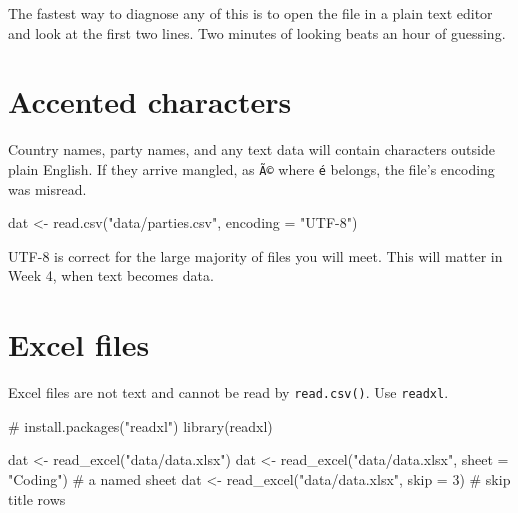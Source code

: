 \documentclass[
  a4paper,
]{scrbook}
\newenvironment{Shaded}{\begin{snugshade}}{\end{snugshade}}
\newcommand{\AttributeTok}[1]{\textcolor[rgb]{0.40,0.45,0.13}{#1}}
\newcommand{\CommentTok}[1]{\textcolor[rgb]{0.37,0.37,0.37}{#1}}
\newcommand{\DecValTok}[1]{\textcolor[rgb]{0.68,0.00,0.00}{#1}}
\newcommand{\FunctionTok}[1]{\textcolor[rgb]{0.28,0.35,0.67}{#1}}
\newcommand{\NormalTok}[1]{\textcolor[rgb]{0.00,0.23,0.31}{#1}}
\newcommand{\OtherTok}[1]{\textcolor[rgb]{0.00,0.23,0.31}{#1}}
\newcommand{\StringTok}[1]{\textcolor[rgb]{0.13,0.47,0.30}{#1}}
\begin{document}
The fastest way to diagnose any of this is to open the file in a plain
text editor and look at the first two lines. Two minutes of looking
beats an hour of guessing.

\section*{Accented characters}\label{accented-characters}


Country names, party names, and any text data will contain characters
outside plain English. If they arrive mangled, as \texttt{Ã©} where
\texttt{é} belongs, the file's encoding was misread.

\begin{Shaded}
\begin{Highlighting}[]
\NormalTok{dat }\OtherTok{\textless{}{-}} \FunctionTok{read.csv}\NormalTok{(}\StringTok{"data/parties.csv"}\NormalTok{, }\AttributeTok{encoding =} \StringTok{"UTF{-}8"}\NormalTok{)}
\end{Highlighting}
\end{Shaded}

UTF-8 is correct for the large majority of files you will meet. This
will matter in Week 4, when text becomes data.

\section*{Excel files}\label{excel-files}


Excel files are not text and cannot be read by \texttt{read.csv()}. Use
\texttt{readxl}.

\begin{Shaded}
\begin{Highlighting}[]
\CommentTok{\# install.packages("readxl")}
\FunctionTok{library}\NormalTok{(readxl)}

\NormalTok{dat }\OtherTok{\textless{}{-}} \FunctionTok{read\_excel}\NormalTok{(}\StringTok{"data/data.xlsx"}\NormalTok{)}
\NormalTok{dat }\OtherTok{\textless{}{-}} \FunctionTok{read\_excel}\NormalTok{(}\StringTok{"data/data.xlsx"}\NormalTok{, }\AttributeTok{sheet =} \StringTok{"Coding"}\NormalTok{)   }\CommentTok{\# a named sheet}
\NormalTok{dat }\OtherTok{\textless{}{-}} \FunctionTok{read\_excel}\NormalTok{(}\StringTok{"data/data.xlsx"}\NormalTok{, }\AttributeTok{skip =} \DecValTok{3}\NormalTok{)           }\CommentTok{\# skip title rows}
\end{Highlighting}
\end{Shaded}
\end{document}
